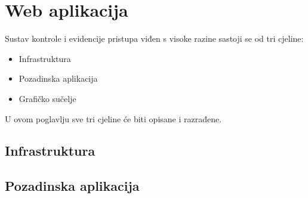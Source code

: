 \chapter{Web aplikacija}

Sustav kontrole i evidencije pristupa viđen s visoke razine sastoji se od tri cjeline:
\begin{itemize}
    \item Infrastruktura
    \item Pozadinska aplikacija
    \item Grafičko sučelje
\end{itemize}

U ovom poglavlju sve tri cjeline će biti opisane i razrađene.

\section{Infrastruktura}


\section{Pozadinska aplikacija}


